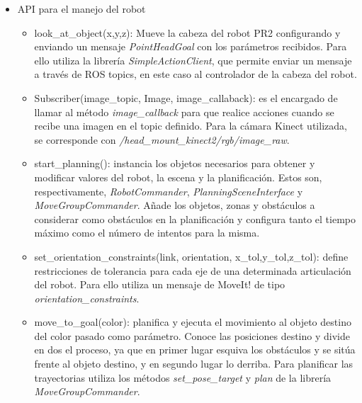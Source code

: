 \documentclass[12pt,spanish,chapterprefix, numbers=noenddot]{book}
\numberwithin{equation}{section}
\numberwithin{figure}{section}
\begin{document}
\begin{itemize}
\item{API para el manejo del robot}
    \begin{itemize}
    \item look\_at\_object(x,y,z): Mueve la cabeza del robot PR2 configurando y enviando un mensaje \textit{PointHeadGoal} con los parámetros recibidos. Para ello utiliza la librería \textit{SimpleActionClient}, que permite enviar un mensaje a través de ROS topics, en este caso al controlador de la cabeza del robot. 
    \item Subscriber(image\_topic, Image, image\_callaback): es el encargado de llamar al método \textit{image\_callback} para que realice acciones cuando se recibe una imagen en el topic definido. Para la cámara Kinect utilizada, se corresponde con \textit{/head\_mount\_kinect2/rgb/image\_raw}.
    \item start\_planning(): instancia los objetos necesarios para obtener y modificar valores del robot, la escena y la planificación. Estos son, respectivamente, \textit{RobotCommander}, \textit{PlanningSceneInterface} y \textit{MoveGroupCommander}. Añade los objetos, zonas y obstáculos a considerar como obstáculos en la planificación y configura tanto el tiempo máximo como el número de intentos para la misma. 
    \item set\_orientation\_constraints(link, orientation, x\_tol,y\_tol,z\_tol): define restricciones de tolerancia para cada eje de una determinada articulación del robot. Para ello utiliza un mensaje de MoveIt! de tipo \textit{orientation\_constraints}.
    \item move\_to\_goal(color): planifica y ejecuta el movimiento al objeto destino del color pasado como parámetro. Conoce las posiciones destino y divide en dos el proceso, ya que en primer lugar esquiva los obstáculos y se sitúa frente al objeto destino, y en segundo lugar lo derriba. Para planificar las trayectorias utiliza los métodos \textit{set\_pose\_target} y \textit{plan} de la librería \textit{MoveGroupCommander}.
    \end{itemize}
\end{itemize}
\end{document}
